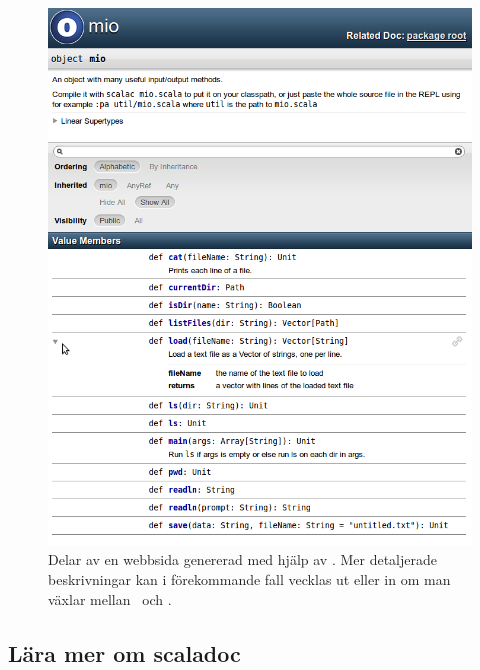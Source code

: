 \begin{figure}[t]
\includegraphics[width=1.0\textwidth]{../img/scaladoc/scaladoc-mio}
    \caption{Delar av en webbsida genererad med hjälp av \scaladoc. Mer detaljerade beskrivningar kan i förekommande fall vecklas ut eller in om man växlar mellan \Forward\ och \MoveDown.}
    \label{fig:scaladoc:webpage}
\end{figure}


\subsection{Lära mer om scaladoc}


